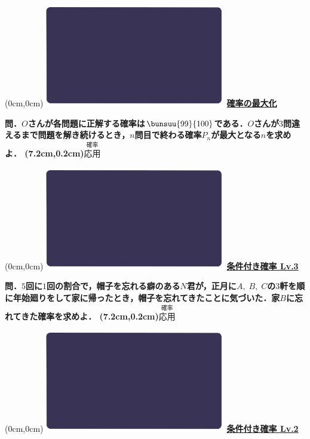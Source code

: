 \documentclass[10pt,
fleqn,
dvipdfmx,
uplatex
]{jsarticle}
\begin{document}
\at(0cm,0cm){\includegraphics[width=8cm,bb=0 0 1920 1080]{./youtube/thumbnails/templates/smart_background/確率.jpeg}}
{\color{orange}\bf\boldmath\huge\underline{確率の最大化}}\vspace{0.3zw}

\Large 
\bf\boldmath 問．$O$さんが各問題に正解する確率は$\bunsuu{{99}}{{100}}$である．$O$さんが$3$問違えるまで問題を解き続けるとき，$n$問目で終わる確率$P_n$が最大となる$n$を求めよ．
\at(7.2cm,0.2cm){\small\color{bradorange}$\overset{\text{確率}}{\text{応用}}$}


\newpage



\at(0cm,0cm){\includegraphics[width=8cm,bb=0 0 1920 1080]{./youtube/thumbnails/templates/smart_background/確率.jpeg}}
{\color{orange}\bf\boldmath\LARGE\underline{条件付き確率 Lv.3 }}\vspace{0.3zw}

\normalsize 
\bf\boldmath 問．$5$回に$1$回の割合で，帽子を忘れる癖のある$N$君が，正月に$A,\;B,\;C$の$3$軒を順に年始廻りをして家に帰ったとき，帽子を忘れてきたことに気づいた．家$B$に忘れてきた確率を求めよ．
\at(7.2cm,0.2cm){\small\color{bradorange}$\overset{\text{確率}}{\text{応用}}$}


\newpage



\at(0cm,0cm){\includegraphics[width=8cm,bb=0 0 1920 1080]{./youtube/thumbnails/templates/smart_background/確率.jpeg}}
{\color{orange}\bf\boldmath\LARGE\underline{条件付き確率 Lv.2 }}\vspace{0.3zw}
\end{document}
